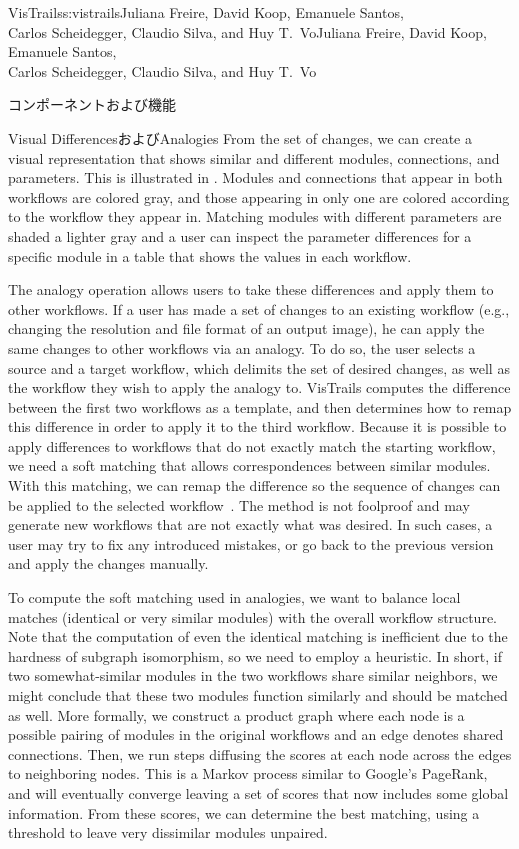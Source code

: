 \begin{aosachaptertoc}{VisTrails}{s:vistrails}{Juliana Freire, David Koop, Emanuele Santos, \\ Carlos Scheidegger, Claudio Silva, and Huy T.\ Vo}{Juliana Freire, David Koop, Emanuele Santos, \\ \hspace*{0.9cm} Carlos Scheidegger, Claudio Silva, and Huy T.\ Vo}
\begin{aosasect1}{コンポーネントおよび機能}
\begin{aosasect2}{Visual DifferencesおよびAnalogies}
From the set of changes, we can create a visual representation
that shows similar and different modules, connections, and parameters.
This is illustrated in 
. Modules and connections that
appear in both workflows are colored gray, and those appearing in only
one are colored according to the workflow they appear in.  Matching
modules with different parameters are shaded a lighter gray and a user
can inspect the parameter differences for a specific module in a table
that shows the values in each workflow.

The analogy operation allows users to take these differences and apply
them to other workflows.  If a user has made a set of changes to an
existing workflow (e.g., changing the resolution and file format of an
output image), he can apply the same changes to other workflows via an
analogy.  To do so, the user selects a source and a target workflow,
which delimits the set of desired changes, as well as the workflow
they wish to apply the analogy to.  VisTrails computes the difference
between the first two workflows as a template, and then determines 
how to remap this difference in order to apply it to the third
workflow.  Because it is possible to apply differences to workflows
that do not exactly match the starting workflow, we need a soft
matching that allows correspondences between similar modules.  With
this matching, we can remap the difference so the sequence of changes
can be applied to the selected
workflow~\cite{bib:scheidegger:analogy}.  The method is not foolproof
and may generate new workflows that are not exactly what was desired.
In such cases, a user may try to fix any introduced mistakes, or go
back to the previous version and apply the changes manually.

To compute the soft matching used in analogies, we want to balance
local matches (identical or very similar modules) with the overall
workflow structure.  Note that the computation of even the identical
matching is inefficient due to the hardness of subgraph isomorphism,
so we need to employ a heuristic.  In short, if two somewhat-similar
modules in the two workflows share similar neighbors, we might
conclude that these two modules function similarly and should be
matched as well.  More formally, we construct a product graph where
each node is a possible pairing of modules in the original workflows
and an edge denotes shared connections.  Then, we run steps diffusing
the scores at each node across the edges to neighboring nodes.  This
is a Markov process similar to Google's PageRank, and will eventually
converge leaving a set of scores that now includes some global
information.  From these scores, we can determine the best matching,
using a threshold to leave very dissimilar modules unpaired.


\end{aosasect2}
\end{aosasect1}
\end{aosachaptertoc}
